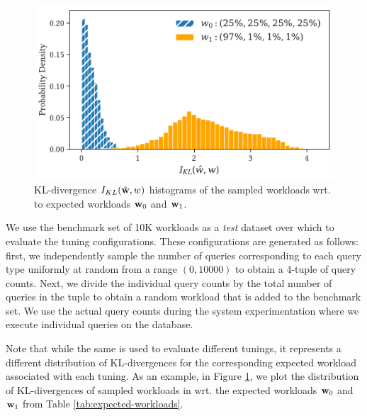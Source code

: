 \begin{figure}
    \centering
    \includegraphics[scale=0.5]{figures/KL_divergence_histogram.pdf}
    \caption{KL-divergence $I_{KL}({{\hat{\bf{w}}}}, w)$ histograms of the sampled
        workloads wrt. to expected workloads ${{\bf{w}}}_0$ and ${{\bf{w}}}_1$.}
    \label{fig:KL_divergence_histogram}
\end{figure}

We use the benchmark set of 10K workloads {\benchmark} as a \emph{test} dataset
    over which to evaluate the tuning configurations.
These configurations are generated as follows:
first, we independently sample the number of queries corresponding to each 
    query type uniformly at random from a range $(0, 10000)$ to obtain a $4$-tuple
    of query counts.
Next, we divide the individual query counts by the total number of queries in 
    the tuple to obtain a random workload that is added to the benchmark set.
We use the actual query counts during the system experimentation where we
    execute individual queries on the database.

Note that while the same {\benchmark}
    is used to evaluate different tunings, it represents a different 
    distribution of KL-divergences for the corresponding expected workload 
    associated with each tuning.
As an example, in Figure \ref{fig:KL_divergence_histogram}, we plot the 
    distribution of KL-divergences of sampled workloads in {\benchmark} 
    wrt. the expected workloads ${{\bf{w}}}_0$ and ${{\bf{w}}}_1$ from 
    Table \ref{tab:expected-workloads}.
